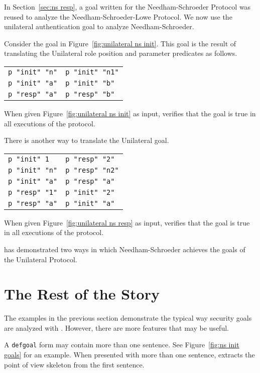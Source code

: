 \documentclass[12pt]{article}
\begin{document}
In Section~\ref{sec:ns resp}, a goal written for the Needham-Schroeder
Protocol was reused to analyze the Needham-Schroeder-Lowe Protocol.
We now use the unilateral authentication goal to analyze
Needham-Schroeder.

Consider the goal in Figure~\ref{fig:unilateral ns init}.  This goal
is the result of translating the Unilateral role position and
parameter predicates as follows.
\begin{center}
\begin{tabular}{l@{$\quad\rightarrow\quad$}l}
  \texttt{p "init" "n"}&\texttt{p "init" "n1"}\\
  \texttt{p "init" "a"}&\texttt{p "init" "b"}\\
  \texttt{p "resp" "a"}&\texttt{p "resp" "b"}
\end{tabular}
\end{center}
When given Figure~\ref{fig:unilateral ns init} as input, {\cpsa}
verifies that the goal is true in all executions of the protocol.

There is another way to translate the Unilateral goal.
\begin{center}
\begin{tabular}{l@{$\quad\rightarrow\quad$}l}
  \texttt{p "init" 1}&\texttt{p "resp" "2"}\\
  \texttt{p "init" "n"}&\texttt{p "resp" "n2"}\\
  \texttt{p "init" "a"}&\texttt{p "resp" "a"}\\
  \texttt{p "resp" "1"}&\texttt{p "init" "2"}\\
  \texttt{p "resp" "a"}&\texttt{p "init" "a"}
\end{tabular}
\end{center}
When given Figure~\ref{fig:unilateral ns resp} as input, {\cpsa}
verifies that the goal is true in all executions of the protocol.

{\cpsa} has demonstrated two ways in which Needham-Schroeder achieves
the goals of the Unilateral Protocol.

\section{The Rest of the Story}\label{sec:whole story}

The examples in the previous section demonstrate the typical way
security goals are analyzed with {\cpsa}.  However, there are more
features that may be useful.

A \texttt{defgoal} form may contain more than one sentence.  See
Figure~\ref{fig:ns init goals} for an example.  When presented with
more than one sentence, {\cpsa} extracts the point of view skeleton
from the first sentence.
\end{document}
